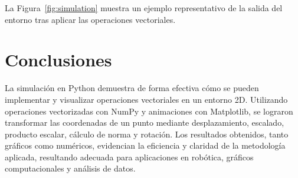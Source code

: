 \documentclass[a4paper, 10pt]{article}
\begin{document}
La Figura~\ref{fig:simulation} muestra un ejemplo representativo de la salida del entorno tras aplicar las operaciones vectoriales.



\section{Conclusiones}\label{s:4}
La simulación en Python demuestra de forma efectiva cómo se pueden implementar y visualizar operaciones vectoriales en un entorno 2D. Utilizando operaciones vectorizadas con NumPy y animaciones con Matplotlib, se lograron transformar las coordenadas de un punto mediante desplazamiento, escalado, producto escalar, cálculo de norma y rotación. Los resultados obtenidos, tanto gráficos como numéricos, evidencian la eficiencia y claridad de la metodología aplicada, resultando adecuada para aplicaciones en robótica, gráficos computacionales y análisis de datos.
\end{document}

